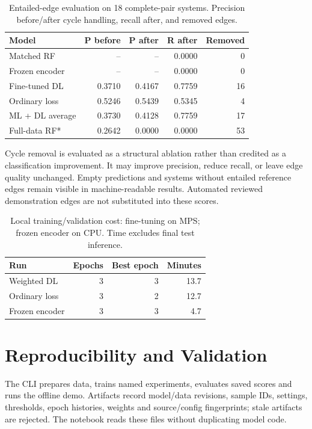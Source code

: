 \documentclass[conference]{IEEEtran}
\begin{document}
\begin{table}[t]
\caption{Entailed-edge evaluation on 18 complete-pair systems. Precision before/after cycle handling, recall after, and removed edges.}
\centering\scriptsize
\begin{tabular}{lrrrr}\toprule
Model & P before & P after & R after & Removed\\\midrule
Matched RF & -- & -- & 0.0000 & 0 \\
Frozen encoder & -- & -- & 0.0000 & 0 \\
Fine-tuned DL & 0.3710 & 0.4167 & 0.7759 & 16 \\
Ordinary loss & 0.5246 & 0.5439 & 0.5345 & 4 \\
ML + DL average & 0.3730 & 0.4128 & 0.7759 & 17 \\
Full-data RF* & 0.2642 & 0.0000 & 0.0000 & 53 \\
\bottomrule\end{tabular}
\end{table}
Cycle removal is evaluated as a structural ablation rather than credited as a classification improvement. It may improve precision, reduce recall, or leave edge quality unchanged. Empty predictions and systems without entailed reference edges remain visible in machine-readable results. Automated reviewed demonstration edges are not substituted into these scores.

\begin{table}[t]
\caption{Local training/validation cost: fine-tuning on MPS; frozen encoder on CPU. Time excludes final test inference.}
\centering\small
\begin{tabular}{lrrr}\toprule
Run & Epochs & Best epoch & Minutes\\\midrule
Weighted DL & 3 & 3 & 13.7 \\
Ordinary loss & 3 & 2 & 12.7 \\
Frozen encoder & 3 & 3 & 4.7 \\
\bottomrule\end{tabular}
\end{table}

\section{Reproducibility and Validation}
The CLI prepares data, trains named experiments, evaluates saved scores and runs the offline demo. Artifacts record model/data revisions, sample IDs, settings, thresholds, epoch histories, weights and source/config fingerprints; stale artifacts are rejected. The notebook reads these files without duplicating model code.
\end{document}
